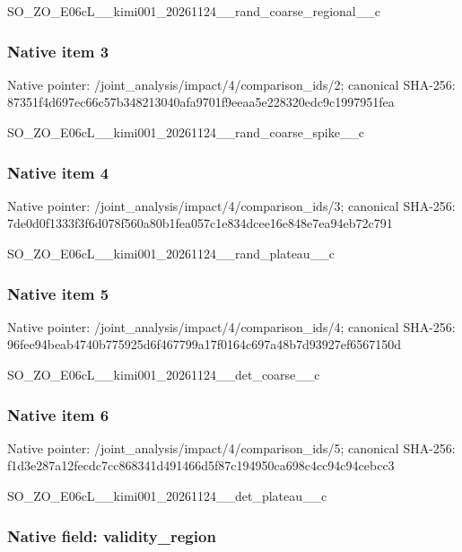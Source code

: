 \documentclass[10pt,a4paper]{article}
\begin{document}
SO\_ZO\_E06cL\_\_kimi001\_202\allowbreak{}61124\_\_rand\_coarse\_regio\allowbreak{}nal\_\_c


\subsubsection{Native item 3}


Native pointer: /joint\_analysis/impact/4\allowbreak{}/comparison\_ids/2; canonical SHA-256: 87351f4d697ec66c57b34821\allowbreak{}3040afa9701f9eeaa5e22832\allowbreak{}0edc9c1997951fea


SO\_ZO\_E06cL\_\_kimi001\_202\allowbreak{}61124\_\_rand\_coarse\_spike\allowbreak{}\_\_c


\subsubsection{Native item 4}


Native pointer: /joint\_analysis/impact/4\allowbreak{}/comparison\_ids/3; canonical SHA-256: 7de0d0f1333f3f6d078f560a\allowbreak{}80b1fea057c1e834dcee16e8\allowbreak{}48e7ea94eb72c791


SO\_ZO\_E06cL\_\_kimi001\_202\allowbreak{}61124\_\_rand\_plateau\_\_c


\subsubsection{Native item 5}


Native pointer: /joint\_analysis/impact/4\allowbreak{}/comparison\_ids/4; canonical SHA-256: 96fee94beab4740b775925d6\allowbreak{}f467799a17f0164c697a48b7\allowbreak{}d93927ef6567150d


SO\_ZO\_E06cL\_\_kimi001\_202\allowbreak{}61124\_\_det\_coarse\_\_c


\subsubsection{Native item 6}


Native pointer: /joint\_analysis/impact/4\allowbreak{}/comparison\_ids/5; canonical SHA-256: f1d3e287a12fecdc7cc86834\allowbreak{}1d491466d5f87c194950ca69\allowbreak{}8c4cc94c94cebcc3


SO\_ZO\_E06cL\_\_kimi001\_202\allowbreak{}61124\_\_det\_plateau\_\_c


\subsubsection{Native field: validity\_region}
\end{document}
